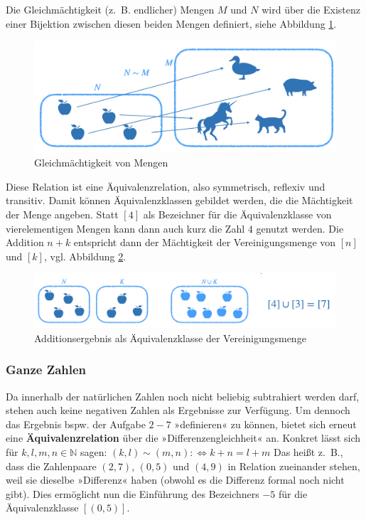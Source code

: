 \documentclass[
]{scrbook}
\theoremstyle{definition}
\theoremstyle{definition}
\theoremstyle{definition}
\theoremstyle{definition}
\theoremstyle{remark}
\begin{document}
Die Gleichmächtigkeit (z.~B. endlicher) Mengen \(M\) und \(N\) wird über die Existenz einer Bijektion zwischen diesen beiden Mengen definiert, siehe Abbildung \ref{fig:Bijektion}.

\begin{figure}

{\centering \includegraphics[width=0.75\linewidth]{pictures/9-Bijektion} 

}

\caption{Gleichmächtigkeit von Mengen}\label{fig:Bijektion}
\end{figure}

Diese Relation ist eine Äquivalenzrelation, also symmetrisch, reflexiv und transitiv. Damit können Äquivalenzklassen gebildet werden, die die Mächtigkeit der Menge angeben. Statt \([4]\) als Bezeichner für die Äquivalenzklasse von vierelementigen Mengen kann dann auch kurz die Zahl \(4\) genutzt werden. Die Addition \(n+k\) entspricht dann der Mächtigkeit der Vereinigungsmenge von \([n]\) und \([k]\), vgl. Abbildung \ref{fig:Vereinigung}.

\begin{figure}

{\centering \includegraphics[width=0.9\linewidth]{pictures/9-Vereinigung} 

}

\caption{Additionsergebnis als Äquivalenzklasse der Vereinigungsmenge}\label{fig:Vereinigung}
\end{figure}

\hypertarget{ganze-zahlen}{%
\subsubsection{Ganze Zahlen}\label{ganze-zahlen}}

Da innerhalb der natürlichen Zahlen noch nicht beliebig subtrahiert werden darf, stehen auch keine negativen Zahlen als Ergebnisse zur Verfügung. Um dennoch das Ergebnis bspw. der Aufgabe \(2-7\) »definieren« zu können, bietet sich erneut eine \textbf{Äquivalenzrelation} über die »Differenzengleichheit« an. Konkret lässt sich für \(k,l,m,n\in\mathbb{N}\) sagen:
\((k,l)\sim (m,n):\Leftrightarrow k+n=l+m\)
Das heißt z.~B., dass die Zahlenpaare \((2,7)\), \((0,5)\) und \((4,9)\) in Relation zueinander stehen, weil sie dieselbe »Differenz« haben (obwohl es die Differenz formal noch nicht gibt). Dies ermöglicht nun die Einführung des Bezeichners \(-5\) für die Äquivalenzklasse \([(0,5)]\).
\end{document}
